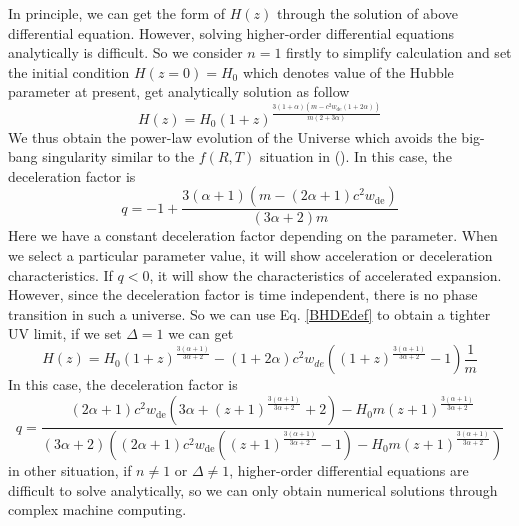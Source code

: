 \documentclass[preprint]{aastex631}
\begin{document}
In principle, we can get the form of $H(z)$ through the solution of above differential equation. However, solving higher-order differential equations analytically is difficult. So we consider $n=1$ firstly to simplify calculation and set the initial condition $H(z=0)=H_0$ which denotes value of the Hubble parameter at present, get analytically solution as follow
\begin{equation}
    H(z)= H_0 (1+z)^{\frac{3 (1+\alpha) \left(m-c^2 w_\text{de}(1+2\alpha)\right)}{m(2+3\alpha)}}
\end{equation}
We thus obtain the power-law evolution of the Universe which avoids the big-bang singularity similar to the $f(R,T)$ situation in (\cite{singhStatefinderDiagnosisHolographic2016}). In this case, the deceleration factor is
\begin{equation}
    q = -1+\frac{3 (\alpha +1) \left(m-(2 \alpha +1) c^2 w_\text{de}\right)}{(3 \alpha +2) m}
\end{equation}
Here we have a constant deceleration factor depending on the parameter. When we select a particular parameter value, it will show acceleration or deceleration characteristics. If $q<0$, it will show the characteristics of accelerated expansion. However, since the deceleration factor is time independent, there is no phase transition in such a universe. So we can use Eq. \eqref{BHDEdef} to obtain a tighter UV limit, if we set $\Delta=1$ we can get 
\begin{equation}
    H(z)= H_0 (1+z)^{\frac{3 (\alpha +1)}{3\alpha +2}}-(1+2 \alpha) c^2 w_{de} \left((1+z)^{\frac{3 (\alpha +1)}{3\alpha +2}}-1\right)\frac{1}{m}
\end{equation}
In this case, the deceleration factor is
\begin{equation}
    q=\frac{(2 \alpha +1) c^2 w_\text{de} \left(3 \alpha +(z+1)^{\frac{3 (\alpha +1)}{3 \alpha +2}}+2\right)-H_0 m (z+1)^{\frac{3 (\alpha +1)}{3 \alpha +2}}}{(3 \alpha +2) \left((2 \alpha +1) c^2 w_\text{de} \left((z+1)^{\frac{3 (\alpha +1)}{3 \alpha +2}}-1\right)-H_0 m (z+1)^{\frac{3 (\alpha +1)}{3 \alpha +2}}\right)}
\end{equation}
in other situation, if $n \neq 1$ or $\Delta \neq 1$, higher-order differential equations are difficult to solve analytically, so we can only obtain numerical solutions through complex machine computing.
\end{document}
